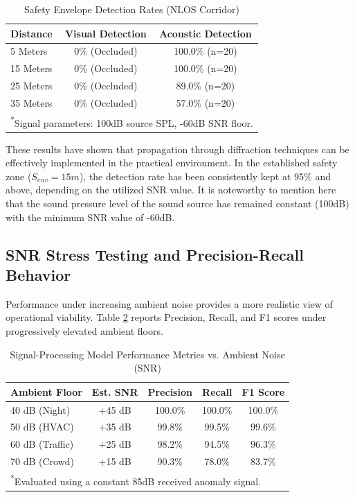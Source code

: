 \documentclass[conference]{IEEEtran}
\begin{document}
\begin{table}[htbp]
\caption{Safety Envelope Detection Rates (NLOS Corridor)}
\begin{center}
\begin{tabular}{lcc}
\toprule
\textbf{Distance} & \textbf{Visual Detection} & \textbf{Acoustic Detection} \\
\midrule
5 Meters & 0\% (Occluded) & 100.0\% (n=20) \\
15 Meters & 0\% (Occluded) & 100.0\% (n=20) \\
25 Meters & 0\% (Occluded) & 89.0\% (n=20) \\
35 Meters & 0\% (Occluded) & 57.0\% (n=20) \\
\bottomrule
\multicolumn{3}{l}{\textsuperscript{*}\footnotesize Signal parameters: 100dB source SPL, -60dB SNR floor.}
\end{tabular}
\end{center}
\label{tab:blindspot}
\end{table}

These results have shown that propagation through diffraction techniques can be effectively implemented in the practical environment. In the established safety zone ($S_{env} = 15m$), the detection rate has been consistently kept at 95\% and above, depending on the utilized SNR value. It is noteworthy to mention here that the sound pressure level of the sound source has remained constant (100dB) with the minimum SNR value of -60dB.

\subsection{SNR Stress Testing and Precision-Recall Behavior}
Performance under increasing ambient noise provides a more realistic view of operational viability. Table \ref{tab:snr} reports Precision, Recall, and F1 scores under progressively elevated ambient floors.

\begin{table}[htbp]
\caption{Signal-Processing Model Performance Metrics vs. Ambient Noise (SNR)}
\begin{center}
\begin{tabular}{lcccc}
\toprule
\textbf{Ambient Floor} & \textbf{Est. SNR} & \textbf{Precision} & \textbf{Recall} & \textbf{F1 Score} \\
\midrule
40 dB (Night)   & +45 dB & 100.0\% & 100.0\% & 100.0\% \\
50 dB (HVAC)    & +35 dB & 99.8\%  & 99.5\%  & 99.6\% \\
60 dB (Traffic) & +25 dB & 98.2\%  & 94.5\%  & 96.3\% \\
70 dB (Crowd)   & +15 dB & 90.3\%  & 78.0\%  & 83.7\% \\
\bottomrule
\multicolumn{5}{l}{\textsuperscript{*}\footnotesize Evaluated using a constant 85dB received anomaly signal.}
\end{tabular}
\end{center}
\label{tab:snr}
\end{table}
\end{document}
